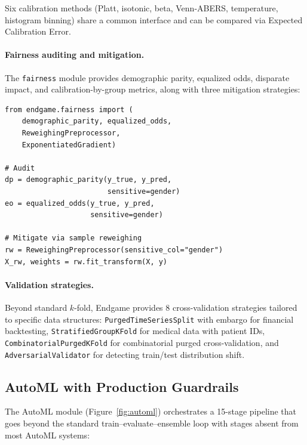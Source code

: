 \documentclass[11pt]{article}
\begin{document}
\noindent Six calibration methods (Platt, isotonic, beta, Venn-ABERS,
temperature, histogram binning) share a common interface and can be
compared via Expected Calibration Error.

\paragraph{Fairness auditing and mitigation.} The \texttt{fairness} module
provides demographic parity, equalized odds, disparate impact, and
calibration-by-group metrics, along with three mitigation strategies:

\begin{lstlisting}[numbers=none]
from endgame.fairness import (
    demographic_parity, equalized_odds,
    ReweighingPreprocessor,
    ExponentiatedGradient)

# Audit
dp = demographic_parity(y_true, y_pred,
                        sensitive=gender)
eo = equalized_odds(y_true, y_pred,
                    sensitive=gender)

# Mitigate via sample reweighing
rw = ReweighingPreprocessor(sensitive_col="gender")
X_rw, weights = rw.fit_transform(X, y)
\end{lstlisting}

\paragraph{Validation strategies.} Beyond standard $k$-fold,
Endgame provides 8 cross-validation strategies tailored to specific data
structures: \texttt{PurgedTimeSeriesSplit} with embargo for financial
backtesting, \texttt{StratifiedGroupKFold} for medical data with patient
IDs, \texttt{CombinatorialPurgedKFold} for combinatorial purged
cross-validation, and \texttt{AdversarialValidator} for detecting
train/test distribution shift.

\subsection{AutoML with Production Guardrails}
\label{sec:eval:automl}

The AutoML module (Figure~\ref{fig:automl}) orchestrates a 15-stage
pipeline that goes beyond the standard train--evaluate--ensemble loop with
stages absent from most AutoML systems:
\end{document}
